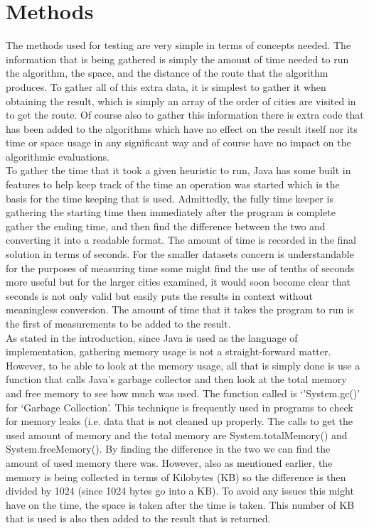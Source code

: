 \documentclass[midd]{thesis}
\newcommand{\tab}{\hspace*{2em}}
\begin{document}
\section{Methods}
\tab The methods used for testing are very simple in terms of concepts needed. The information that is being gathered is simply the amount of time needed to run the algorithm, the space, and the distance of the route that the algorithm produces. To gather all of this extra data, it is simplest to gather it when obtaining the result, which is simply an array of the order of cities are visited in to get the route. Of course also to gather this information there is extra code that has been added to the algorithms which have no effect on the result itself nor its time or space usage in any significant way and of course have no impact on the algorithmic evaluations.\\
\tab To gather the time that it took a given heuristic to run, Java has some built in features to help keep track of the time an operation was started which is the basis for the time keeping that is used. Admittedly, the fully time keeper is gathering the starting time then immediately after the program is complete gather the ending time, and then find the difference between the two and converting it into a readable format. The amount of time is recorded in the final solution in terms of seconds. For the smaller datasets concern is understandable for the purposes of measuring time some might find the use of tenths of seconds more useful but for the larger cities examined, it would soon become clear that seconds is not only valid but easily puts the results in context without meaningless conversion. The amount of time that it takes the program to run is the first of measurements to be added to the result.\\
\tab As stated in the introduction, since Java is used as the language of implementation, gathering memory usage is not a straight-forward matter. However, to be able to look at the memory usage, all that is simply done is use a function that calls Java's garbage collector and then look at the total memory and free memory to see how much was used. The function called is `'System.gc()'  for `Garbage Collection'. This technique is frequently used in programs to check for memory leaks (i.e. data that is not cleaned up properly. The calls to get the used amount of memory and the total memory are System.totalMemory() and System.freeMemory(). By finding the difference in the two we can find the amount of used memory there was. However, also as mentioned earlier, the memory is being collected in terms of Kilobytes (KB) so the difference is then divided by 1024 (since 1024 bytes go into a KB). To avoid any issues this might have on the time, the space is taken after the time is taken. This number of KB that is used is also then added to the result that is returned.\\
\end{document}
